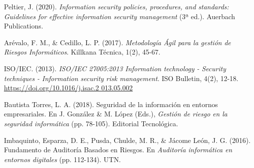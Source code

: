 \hangindent=0.5in
Peltier, J. (2020). \textit{Information security policies, procedures, and standards: Guidelines for effective information security management} (3ª ed.). Auerbach Publications.

\hangindent=0.5in
Arévalo, F. M., \& Cedillo, L. P. (2017). \textit{Metodología Ágil para la gestión de Riesgos Informáticos}. Killkana Técnica, 1(2), 45-67.

\hangindent=0.5in
ISO/IEC. (2013). \textit{ISO/IEC 27005:2013 Information technology - Security techniques - Information security risk management}. ISO Bulletin, 4(2), 12-18. \href{https://doi.org/10.1016/j.isac.2013.05.002}{https://doi.org/10.1016/j.isac.2 013.05.002}

\hangindent=0.5in
Bautista Torres, L. A. (2018). Seguridad de la información en entornos empresariales. En J. González \& M. López (Eds.), \textit{Gestión de riesgo en la seguridad informática} (pp. 78-105). Editorial Tecnológica.

\hangindent=0.5in
Imbaquinto, Esparza, D. E., Pusda, Chulde, M. R., \& Jácome León, J. G. (2016). Fundamento de Auditoría Basados en Riesgos. En \textit{Auditoría informática en entornos digitales} (pp. 112-134). UTN.

\pagebreak